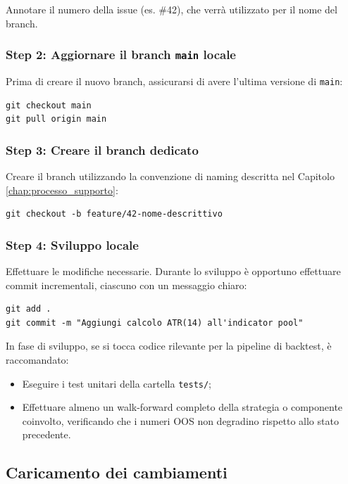 Annotare il numero della issue (es. \#42), che verrà utilizzato per il nome del branch.

\subsubsection{Step 2: Aggiornare il branch \texttt{main} locale}

Prima di creare il nuovo branch, assicurarsi di avere l'ultima versione di \texttt{main}:

\begin{lstlisting}
git checkout main
git pull origin main
\end{lstlisting}

\subsubsection{Step 3: Creare il branch dedicato}

Creare il branch utilizzando la convenzione di naming descritta nel Capitolo \ref{chap:processo_supporto}:

\begin{lstlisting}
git checkout -b feature/42-nome-descrittivo
\end{lstlisting}

\subsubsection{Step 4: Sviluppo locale}

Effettuare le modifiche necessarie. Durante lo sviluppo è opportuno effettuare commit incrementali, ciascuno con un messaggio chiaro:

\begin{lstlisting}
git add .
git commit -m "Aggiungi calcolo ATR(14) all'indicator pool"
\end{lstlisting}

In fase di sviluppo, se si tocca codice rilevante per la pipeline di backtest, è raccomandato:

\begin{itemize}
  \item Eseguire i test unitari della cartella \texttt{tests/};
  \item Effettuare almeno un walk-forward completo della strategia o componente coinvolto, verificando che i numeri OOS non degradino rispetto allo stato precedente.
\end{itemize}

\subsection{Caricamento dei cambiamenti}


